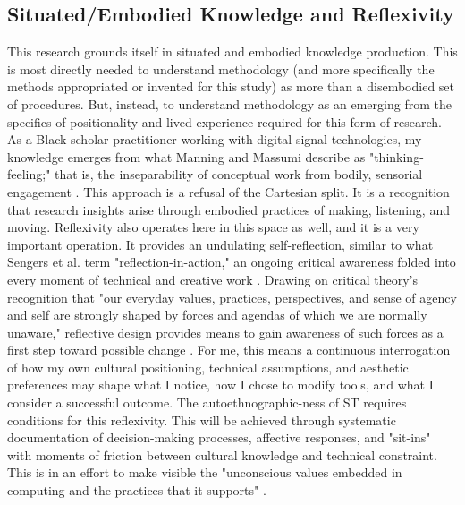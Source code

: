 \subsection{Situated/Embodied Knowledge and Reflexivity}

This research grounds itself in situated and embodied knowledge production. This is most directly needed to understand methodology (and more specifically the methods appropriated or invented for this study) as more than a disembodied set of procedures. But, instead, to understand methodology as an emerging from the specifics of positionality and lived experience required for this form of research. As a Black scholar-practitioner working with digital signal technologies, my knowledge emerges from what Manning and Massumi describe as "thinking-feeling;" that is, the inseparability of conceptual work from bodily, sensorial engagement \parencites[41-42]{Manning_Massumi_2014}. This approach is a refusal of the Cartesian split. It is a recognition that research insights arise through embodied practices of making, listening, and moving. Reflexivity also operates here in this space as well, and it is a very important operation. It provides an undulating self-reflection, similar to what Sengers et al. term "reflection-in-action," an ongoing critical awareness folded into every moment of technical and creative work \parencites[52]{Sengers_2004}. Drawing on critical theory's recognition that "our everyday values, practices, perspectives, and sense of agency and self are strongly shaped by forces and agendas of which we are normally unaware," reflective design provides means to gain awareness of such forces as a first step toward possible change \parencites[50]{Sengers_2004}. For me, this means a continuous interrogation of how my own cultural positioning, technical assumptions, and aesthetic preferences may shape what I notice, how I chose to modify tools, and what I consider a successful outcome. The autoethnographic-ness of ST requires conditions for this reflexivity. This will be achieved through systematic documentation of decision-making processes, affective responses, and "sit-ins" with moments of friction between cultural knowledge and technical constraint. This is in an effort to make visible the "unconscious values embedded in computing and the practices that it supports" \parencites[49]{Sengers_2004}.

